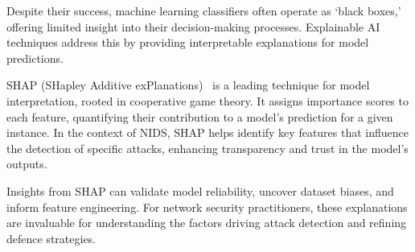 Despite their success, machine learning classifiers often operate as `black boxes,' offering limited insight into their decision-making processes. Explainable AI techniques address this by providing interpretable explanations for model predictions.

SHAP (SHapley Additive exPlanations)~\cite{lundberg2017unified} is a leading technique for model interpretation, rooted in cooperative game theory. It assigns importance scores to each feature, quantifying their contribution to a model’s prediction for a given instance. In the context of NIDS, SHAP helps identify key features that influence the detection of specific attacks, enhancing transparency and trust in the model’s outputs.

Insights from SHAP can validate model reliability, uncover dataset biases, and inform feature engineering. For network security practitioners, these explanations are invaluable for understanding the factors driving attack detection and refining defence strategies.